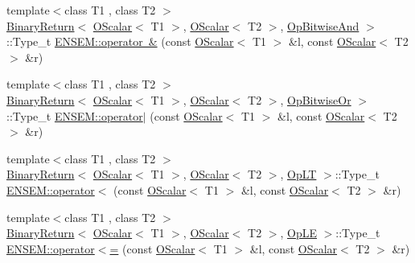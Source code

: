 \begin{DoxyCompactItemize}
\item 
{\footnotesize template$<$class T1 , class T2 $>$ }\\\mbox{\hyperlink{structENSEM_1_1BinaryReturn}{Binary\+Return}}$<$ \mbox{\hyperlink{classENSEM_1_1OScalar}{O\+Scalar}}$<$ T1 $>$, \mbox{\hyperlink{classENSEM_1_1OScalar}{O\+Scalar}}$<$ T2 $>$, \mbox{\hyperlink{structENSEM_1_1OpBitwiseAnd}{Op\+Bitwise\+And}} $>$\+::Type\+\_\+t \mbox{\hyperlink{group__obsscalar_ga0ce8b28e6efb00e905152096020cfafe}{E\+N\+S\+E\+M\+::operator \&}} (const \mbox{\hyperlink{classENSEM_1_1OScalar}{O\+Scalar}}$<$ T1 $>$ \&l, const \mbox{\hyperlink{classENSEM_1_1OScalar}{O\+Scalar}}$<$ T2 $>$ \&r)
\item 
{\footnotesize template$<$class T1 , class T2 $>$ }\\\mbox{\hyperlink{structENSEM_1_1BinaryReturn}{Binary\+Return}}$<$ \mbox{\hyperlink{classENSEM_1_1OScalar}{O\+Scalar}}$<$ T1 $>$, \mbox{\hyperlink{classENSEM_1_1OScalar}{O\+Scalar}}$<$ T2 $>$, \mbox{\hyperlink{structENSEM_1_1OpBitwiseOr}{Op\+Bitwise\+Or}} $>$\+::Type\+\_\+t \mbox{\hyperlink{group__obsscalar_ga9243675542e15046a4e7b9f570ba66d1}{E\+N\+S\+E\+M\+::operator$\vert$}} (const \mbox{\hyperlink{classENSEM_1_1OScalar}{O\+Scalar}}$<$ T1 $>$ \&l, const \mbox{\hyperlink{classENSEM_1_1OScalar}{O\+Scalar}}$<$ T2 $>$ \&r)
\item 
{\footnotesize template$<$class T1 , class T2 $>$ }\\\mbox{\hyperlink{structENSEM_1_1BinaryReturn}{Binary\+Return}}$<$ \mbox{\hyperlink{classENSEM_1_1OScalar}{O\+Scalar}}$<$ T1 $>$, \mbox{\hyperlink{classENSEM_1_1OScalar}{O\+Scalar}}$<$ T2 $>$, \mbox{\hyperlink{structENSEM_1_1OpLT}{Op\+LT}} $>$\+::Type\+\_\+t \mbox{\hyperlink{group__obsscalar_gaf1a8a81f23c6d685296f296827d2a4f0}{E\+N\+S\+E\+M\+::operator$<$}} (const \mbox{\hyperlink{classENSEM_1_1OScalar}{O\+Scalar}}$<$ T1 $>$ \&l, const \mbox{\hyperlink{classENSEM_1_1OScalar}{O\+Scalar}}$<$ T2 $>$ \&r)
\item 
{\footnotesize template$<$class T1 , class T2 $>$ }\\\mbox{\hyperlink{structENSEM_1_1BinaryReturn}{Binary\+Return}}$<$ \mbox{\hyperlink{classENSEM_1_1OScalar}{O\+Scalar}}$<$ T1 $>$, \mbox{\hyperlink{classENSEM_1_1OScalar}{O\+Scalar}}$<$ T2 $>$, \mbox{\hyperlink{structENSEM_1_1OpLE}{Op\+LE}} $>$\+::Type\+\_\+t \mbox{\hyperlink{group__obsscalar_gaf2d22d4258136c38dba73b6d210b7048}{E\+N\+S\+E\+M\+::operator$<$=}} (const \mbox{\hyperlink{classENSEM_1_1OScalar}{O\+Scalar}}$<$ T1 $>$ \&l, const \mbox{\hyperlink{classENSEM_1_1OScalar}{O\+Scalar}}$<$ T2 $>$ \&r)

\end{DoxyCompactItemize}
